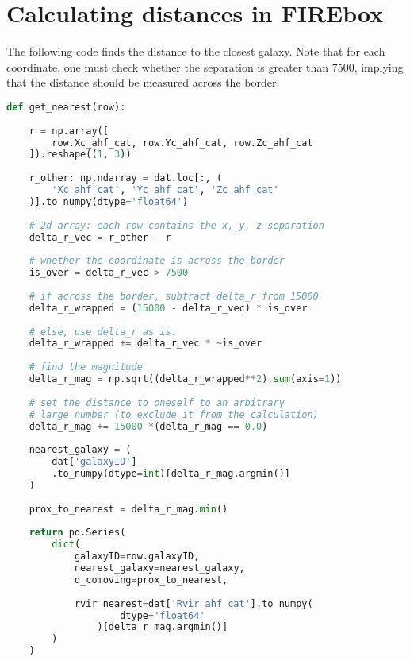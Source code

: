 
\chapter{Calculating distances in FIREbox}
\label{apx:distances}
The following code finds the distance to the closest galaxy. Note that for each coordinate, one must check whether the separation is greater than 7500, implying that the distance should be measured across the border.

\begin{lstlisting}[language=Python]
def get_nearest(row):
    
    r = np.array([
        row.Xc_ahf_cat, row.Yc_ahf_cat, row.Zc_ahf_cat
    ]).reshape((1, 3))
    
    r_other: np.ndarray = dat.loc[:, (
        'Xc_ahf_cat', 'Yc_ahf_cat', 'Zc_ahf_cat'
    )].to_numpy(dtype='float64')
    
    # 2d array: each row contains the x, y, z separation
    delta_r_vec = r_other - r
    
    # whether the coordinate is across the border
    is_over = delta_r_vec > 7500
    
    # if across the border, subtract delta_r from 15000
    delta_r_wrapped = (15000 - delta_r_vec) * is_over
    
    # else, use delta_r as is.
    delta_r_wrapped += delta_r_vec * ~is_over
    
    # find the magnitude
    delta_r_mag = np.sqrt((delta_r_wrapped**2).sum(axis=1))
    
    # set the distance to oneself to an arbitrary
    # large number (to exclude it from the calculation)
    delta_r_mag += 15000 *(delta_r_mag == 0.0)
    
    nearest_galaxy = (
        dat['galaxyID']
        .to_numpy(dtype=int)[delta_r_mag.argmin()]
    )
    
    prox_to_nearest = delta_r_mag.min()
    
    return pd.Series(
        dict(
            galaxyID=row.galaxyID,
            nearest_galaxy=nearest_galaxy,
            d_comoving=prox_to_nearest,
            
            rvir_nearest=dat['Rvir_ahf_cat'].to_numpy(
                    dtype='float64'
                )[delta_r_mag.argmin()]
        )
    )

    
\end{lstlisting}